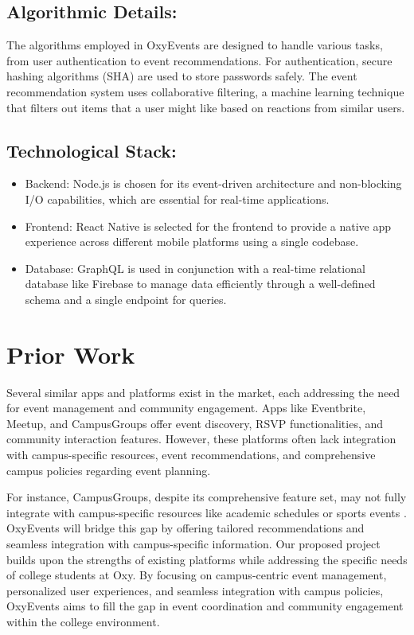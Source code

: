 \documentclass[10pt,twocolumn]{article}
\begin{document}
\subsection{Algorithmic Details:} The algorithms employed in OxyEvents are designed to handle various tasks, from user authentication to event recommendations. For authentication, secure hashing algorithms (SHA) are used to store passwords safely. The event recommendation system uses collaborative filtering, a machine learning technique that filters out items that a user might like based on reactions from similar users.
\subsection{Technological Stack:}
\begin{itemize}
\item  Backend: Node.js is chosen for its event-driven architecture and non-blocking I/O capabilities, which are essential for real-time applications.
\item  Frontend: React Native is selected for the frontend to provide a native app experience across different mobile platforms using a single codebase.
\item  Database: GraphQL is used in conjunction with a real-time relational database like Firebase to manage data efficiently through a well-defined schema and a single endpoint for queries.
\end{itemize}


\section{Prior Work}
Several similar apps and platforms exist in the market, each addressing the need for event management and community engagement. Apps like Eventbrite, Meetup, and CampusGroups offer event discovery, RSVP functionalities, and community interaction features. However, these platforms often lack integration with campus-specific resources, event recommendations, and comprehensive campus policies regarding event planning. 

For instance, CampusGroups, despite its comprehensive feature set, may not fully integrate with campus-specific resources like academic schedules or sports events \cite{CampusGroups}. OxyEvents will bridge this gap by offering tailored recommendations and seamless integration with campus-specific information.
Our proposed project builds upon the strengths of existing platforms while addressing the specific needs of college students at Oxy. By focusing on campus-centric event management, personalized user experiences, and seamless integration with campus policies, OxyEvents aims to fill the gap in event coordination and community engagement within the college environment.
\end{document}
